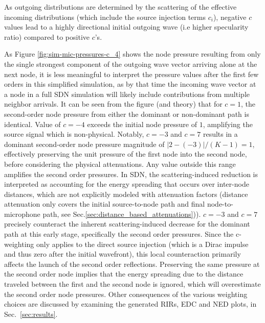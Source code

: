 \documentclass[journal]{IEEEtran}
\begin{document}
As outgoing distributions are determined by the scattering of the effective incoming distributions (which include the source injection terms $c_i$), negative $c$ values lead to a highly directional initial outgoing wave (i.e higher specularity ratio) compared to positive $c$'s.

As Figure \ref{fig:sim-mic-pressures-c_4} shows the node pressure resulting from only the single strongest component of the outgoing wave vector arriving alone at the next node, it is less meaningful to interpret the pressure values after the first few orders in this simplified simulation, as by that time the incoming wave vector at a node in a full SDN simulation will likely include contributions from multiple neighbor arrivals. 
It can be seen from the figure (and theory) that for $c=1$, the second-order node pressure from either the dominant or non-dominant path is identical. 
Value of $c=-4$ exceeds the initial node pressure of $1$, amplifying the source signal which is non-physical. 
Notably, $c=-3$ and $c=7$ results in a dominant second-order node pressure magnitude of $|2-(-3)|/(K-1)=1$, 
effectively preserving the unit pressure of the first node into the second node, before considering the physical attenuations. Any value outside this range amplifies the second order pressures. In SDN, the scattering-induced reduction is interpreted as accounting for the energy spreading that occurs over inter-node distances, which are not explicitly modeled with attenuation factors (distance attenuation only covers the initial source-to-node path and final node-to-microphone path, see Sec.\ref{sec:distance_based_attenuations})). $c=-3$ and $c=7$ precisely counteract the inherent scattering-induced decrease for the dominant path at this early stage, specifically the second order pressures. Since the c-weighting only applies to the direct source injection (which is a Dirac impulse and thus zero after the initial wavefront), this local counteraction primarily affects the launch of the second order reflections. Preserving the same pressure at the second order node implies that the energy spreading due to the distance traveled between the first and the second node is ignored, which will overestimate the second order node pressures. Other consequences of the various weighting choices are discussed by examining the generated RIRs, EDC and NED plots, in Sec.~\ref{sec:results}.
\end{document}
